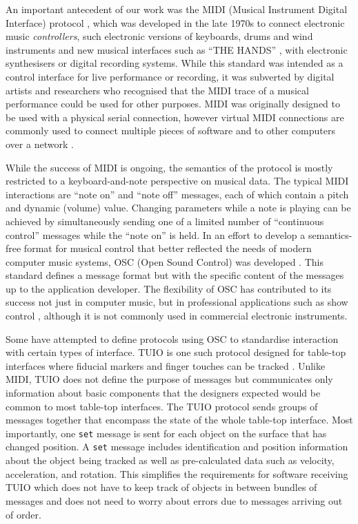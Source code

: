 \documentclass[graybox]{svmult}
\begin{document}
An important antecedent of our work was the
MIDI (Musical Instrument Digital Interface)
protocol \citep{midi1996complete}, which was developed in the late 1970s to connect electronic
music \emph{controllers}, such electronic versions of keyboards, drums
and wind instruments and new musical interfaces such as ``THE
HANDS'' \citep{TheHandsArticle}, with electronic synthesisers or
digital recording systems. While this standard was intended as a
control interface for live performance or recording, it was subverted
by digital artists and researchers who recognised that the MIDI trace
of a musical performance could be used for other purposes. MIDI was
originally designed to be used with a physical serial connection,
however virtual MIDI connections are commonly used to connect multiple
pieces of software and to other computers over a
network \citep{Lazzaro:2004pb}.

While the success of MIDI is ongoing, the semantics of the protocol is
mostly restricted to a keyboard-and-note perspective on musical data.
The typical MIDI interactions are ``note on'' and ``note off''
messages, each of which contain a pitch and dynamic (volume) value.
Changing parameters while a note is playing can be achieved by
simultaneously sending one of a limited number of ``continuous
control'' messages while the ``note on'' is held. In an effort to
develop a semantics-free format for musical control that better
reflected the needs of modern computer music systems,
OSC (Open Sound Control) was developed \citep{osc-nime2009}. This
standard defines a message format but with the specific content of the
messages up to the application developer. The flexibility of OSC has
contributed to its success not just in computer music, but in
professional applications such as show
control \citep{schmeder2010best}, although it is not commonly used in
commercial electronic instruments.

Some have attempted to define protocols using OSC to standardise
interaction with certain types of interface. TUIO is one such protocol
designed for table-top interfaces where fiducial markers and finger
touches can be tracked \citep{TUIO_KBBC05}. Unlike MIDI, TUIO does not
define the purpose of messages but communicates only information about
basic components that the designers expected would be common to most
table-top interfaces. The TUIO protocol sends groups of messages
together that encompass the state of the whole table-top interface.
Most importantly, one \texttt{set} message is sent for each object on
the surface that has changed position. A \texttt{set} message includes
identification and position information about the object being tracked
as well as pre-calculated data such as velocity, acceleration, and
rotation. This simplifies the requirements for software receiving TUIO
which does not have to keep track of objects in between bundles of
messages and does not need to worry about errors due to messages
arriving out of order.
\end{document}
